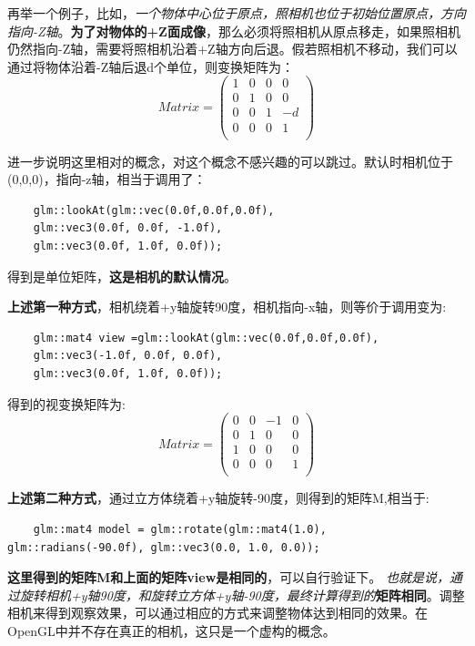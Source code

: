 \documentclass[UTF8,a4paper,12pt]{ctexbook}
\begin{document}
				再举一个例子，比如，\textit{一个物体中心位于原点，照相机也位于初始位置原点，方向指向-Z轴}。\textbf{为了对物体的+Z面成像}，那么必须将照相机从原点移走，如果照相机仍然指向-Z轴，需要将照相机沿着+Z轴方向后退。假若照相机不移动，我们可以通过将物体沿着-Z轴后退d个单位，则变换矩阵为：
					$$
					Matrix = 
					\left(
					\begin{array}{cccc}
					1 & 0 & 0& 0\\
					
					0 & 1 & 0& 0\\
					
					0 & 0 & 1& -d\\
					
					0 & 0 & 0& 1\\
					\end{array}
					\right)
					$$
					
			进一步说明这里相对的概念，对这个概念不感兴趣的可以跳过。默认时相机位于(0,0,0)，指向-z轴，相当于调用了：
			\begin{lstlisting}
	glm::lookAt(glm::vec(0.0f,0.0f,0.0f),
	glm::vec3(0.0f, 0.0f, -1.0f),
	glm::vec3(0.0f, 1.0f, 0.0f));
			\end{lstlisting}
			得到是单位矩阵，\textbf{这是相机的默认情况}。
			
			\textbf{上述第一种方式}，相机绕着+y轴旋转90度，相机指向-x轴，则等价于调用变为:
			\begin{lstlisting}
	glm::mat4 view =glm::lookAt(glm::vec(0.0f,0.0f,0.0f),
	glm::vec3(-1.0f, 0.0f, 0.0f),
	glm::vec3(0.0f, 1.0f, 0.0f));
			\end{lstlisting}
			得到的视变换矩阵为:
				$$
				Matrix = 
				\left(
				\begin{array}{cccc}
				0 & 0 & -1& 0\\
				
				0 & 1 & 0& 0\\
				
				1 & 0 & 0& 0\\
				
				0 & 0 & 0& 1\\
				\end{array}
				\right)
				$$
			
			\textbf{上述第二种方式}，通过立方体绕着+y轴旋转-90度，则得到的矩阵M,相当于:
				\begin{lstlisting}
	glm::mat4 model = glm::rotate(glm::mat4(1.0), glm::radians(-90.0f), glm::vec3(0.0, 1.0, 0.0));
				\end{lstlisting}
				
			\textbf{这里得到的矩阵M和上面的矩阵view是相同的}，可以自行验证下。 
			\textit{也就是说，通过旋转相机+y轴90度，和旋转立方体+y轴-90度，最终计算得到的}\textbf{矩阵相同}。调整相机来得到观察效果，可以通过相应的方式来调整物体达到相同的效果。在OpenGL中并不存在真正的相机，这只是一个虚构的概念。
			
\end{document}
